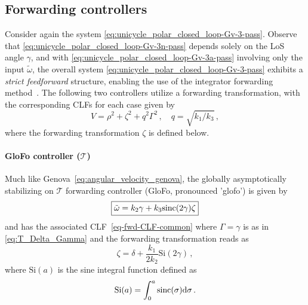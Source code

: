 \documentclass[journal,twoside,web]{ieeecolor}
\theoremstyle{definition}
\begin{document}
\subsection{Forwarding controllers}
Consider again the system \eqref{eq:unicycle_polar_closed_loop-Gv-3-pass}. Observe that \eqref{eq:unicycle_polar_closed_loop-Gv-3n-pass} depends solely on the LoS angle $\gamma$, and with \eqref{eq:unicycle_polar_closed_loop-Gv-3a-pass} involving only the input $\tilde{\omega}$, the overall system \eqref{eq:unicycle_polar_closed_loop-Gv-3-pass} exhibits a \textit{strict feedforward} structure, enabling the use of the integrator forwarding method~\cite{sepulchre1997forwarding,mazenc2002adding, krstic2004feedback}. The following two controllers utilize a forwarding transformation, with the corresponding CLFs for each case given by
\begin{equation}
\label{eq-fwd-CLF-common}
V = 
\rho^2+ \zeta^2 + q^2\Gamma^2\,, \quad  q = \sqrt{k_1/k_3} 
\,,
\end{equation}
where the forwarding transformation $\zeta$ is defined below.
\paragraph{GloFo controller ($\mathcal{T}$)} Much like Genova~\eqref{eq:angular_velocity_genova}, the globally asymptotically stabilizing on $\mathcal{T}$ forwarding controller (GloFo, pronounced 'glofo') is given by 
\begin{equation}
\label{eq:GloFo}
\fbox{$\tilde\omega = k_2\gamma + k_3\mbox{sinc}(2\gamma) \zeta
$}
\end{equation}
and has the associated CLF~\eqref{eq-fwd-CLF-common} where $\Gamma = \gamma$ is as in \eqref{eq:T_Delta_Gamma}
and the forwarding transformation reads as
\begin{equation}
    \zeta = \delta + \dfrac{k_1}{2k_2}\mbox{Si}(2\gamma)\,,
\end{equation}
where $\mbox{Si}(a)$ is the sine integral function defined as
\begin{align}
\mbox{Si}(a) = \int_0^{a}\mbox{sinc}(\sigma){\rm d} \sigma
\,. \label{eq:Si_function}
\end{align}
\end{document}
